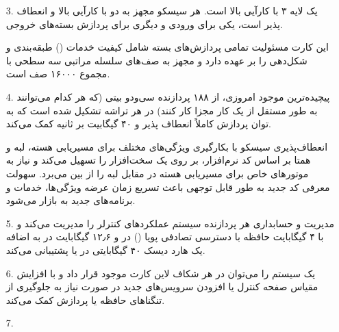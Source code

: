 \begin{qsolve}
	\begin{enumerate}
		\item [3.]
		یک  لایه ۳ با کارآیی بالا است. هر سیسکو  مجهز به دو  با کارآیی بالا و انعطاف پذیر است، یکی برای ورودی و دیگری برای پردازش بسته‌های خروجی.
		
		این کارت مسئولیت تمامی پردازش‌های بسته شامل کیفیت خدمات () طبقه‌بندی و شکل‌دهی را بر عهده دارد و مجهز به صف‌های سلسله مراتبی سه سطحی با مجموع ۱۶۰۰۰ صف است.
		
		\item [4.]
		پیچیده‌ترین  موجود امروزی، از ۱۸۸ پردازنده  سی‌و‌دو بیتی (که هر کدام می‌توانند به طور مستقل از یک کار مجزا کار کنند) در هر تراشه تشکیل شده است که به توان پردازش کاملاً انعطاف پذیر و ۴۰ گیگابیت بر ثانیه کمک می‌کند.
		
		انعطاف‌پذیری  سیسکو با بکارگیری ویژگی‌های مختلف برای مسیریابی هسته، لبه و همتا بر اساس کد نرم‌افزار، بر روی یک سخت‌افزار را تسهیل می‌کند و نیاز به موتورهای خاص برای مسیریابی هسته در مقابل لبه را از بین می‌برد. سهولت معرفی کد جدید به طور قابل توجهی باعث تسریع زمان عرضه ویژگی‌ها، خدمات و برنامه‌های جدید به بازار می‌شود.
		
		
		\item [5.]
		مدیریت و حسابداری هر پردازنده سیستم  عملکردهای کنترلر  را مدیریت می‌کند و با ۴ گیگابایت حافظه با دسترسی تصادفی پویا () در  و ۱۲٫۶ گیگابایت در  به اضافه یک هارد دیسک ۴۰ گیگابایتی در  یا  پشتیبانی می‌کند.
		
		
		\item [6.]
		یک سیستم  را می‌توان در هر شکاف لاین کارت موجود قرار داد و با افزایش مقیاس صفحه کنترل یا افزودن سرویس‌های جدید در صورت نیاز به جلوگیری از تنگناهای حافظه یا پردازش کمک می‌کند.
		
		\item [7.]
	\end{enumerate}
\end{qsolve}


